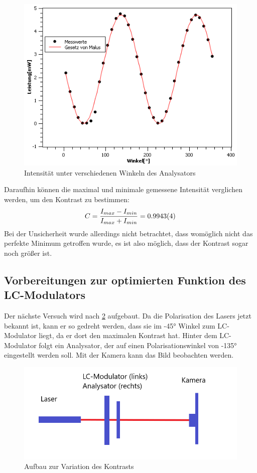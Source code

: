 \begin{figure}[h!]
	\centering
	\includegraphics[scale=0.8]{GesetzvonMalus.png}
	\caption{Intensität unter verschiedenen Winkeln des Analysators}
	\label{Malus}
\end{figure}

Daraufhin können die maximal und minimale gemessene Intensität verglichen werden, um den Kontrast zu bestimmen:
\begin{equation}
	C = \frac{I_{max} - I_{min}}{I_{max} + I_{min}} = \SI{0,9943 \pm 0,0004}{}
	\label{eq:Kontrast}
\end{equation}
Bei der Unsicherheit wurde allerdings nicht betrachtet, dass womöglich nicht das perfekte Minimum getroffen wurde, es ist also möglich, dass der Kontrast sogar noch größer ist. 

\subsection{Vorbereitungen zur optimierten Funktion des LC-Modulators}
Der nächste Versuch wird nach \cref{412} aufgebaut. Da die Polarisation des Lasers jetzt bekannt ist, kann er so gedreht werden, dass sie im -45° Winkel zum LC-Modulator liegt, da er dort den maximalen Kontrast hat. Hinter dem LC-Modulator folgt ein Analysator, der auf einen Polarisationswinkel von -135° eingestellt werden soll. Mit der Kamera kann das Bild beobachten werden.

\begin{figure}[h!]
	\centering
	\includegraphics[scale=1]{4.1.2-Aufbau.png}
	\caption{Aufbau zur Variation des Kontrasts}
	\label{412}
\end{figure}


